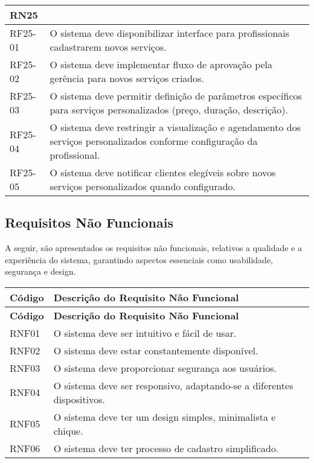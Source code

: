 \begin{longtable}{|p{}|p{}|}
	\multicolumn{2}{|l|}{\textbf{RN25}} \\ \hline
	RF25-01 & O sistema deve disponibilizar interface para profissionais cadastrarem novos serviços. \\ \hline
	RF25-02 & O sistema deve implementar fluxo de aprovação pela gerência para novos serviços criados. \\ \hline
	RF25-03 & O sistema deve permitir definição de parâmetros específicos para serviços personalizados (preço, duração, descrição). \\ \hline
	RF25-04 & O sistema deve restringir a visualização e agendamento dos serviços personalizados conforme configuração da profissional. \\ \hline
	RF25-05 & O sistema deve notificar clientes elegíveis sobre novos serviços personalizados quando configurado. \\ \hline
	

\end{longtable}



\subsection{Requisitos Não Funcionais}

A seguir, são apresentados os requisitos não funcionais, relativos a qualidade e a experiência do sistema, garantindo aspectos essenciais como usabilidade, segurança e design.

\begin{longtable}{|p{}|p{}|}
	\hline
	\textbf{Código} & \textbf{Descrição do Requisito Não Funcional} \\
	\hline
	\endfirsthead
	
	\hline
	\textbf{Código} & \textbf{Descrição do Requisito Não Funcional} \\
	\hline
	\endhead
	
	RNF01 & O sistema deve ser intuitivo e fácil de usar. \\ \hline
	RNF02 & O sistema deve estar constantemente disponível. \\ \hline
	RNF03 & O sistema deve proporcionar segurança aos usuários. \\ \hline
	RNF04 & O sistema deve ser responsivo, adaptando-se a diferentes dispositivos. \\ \hline
	RNF05 & O sistema deve ter um design simples, minimalista e chique. \\ \hline
	RNF06 & O sistema deve ter processo de cadastro simplificado. \\ \hline
\end{longtable}

